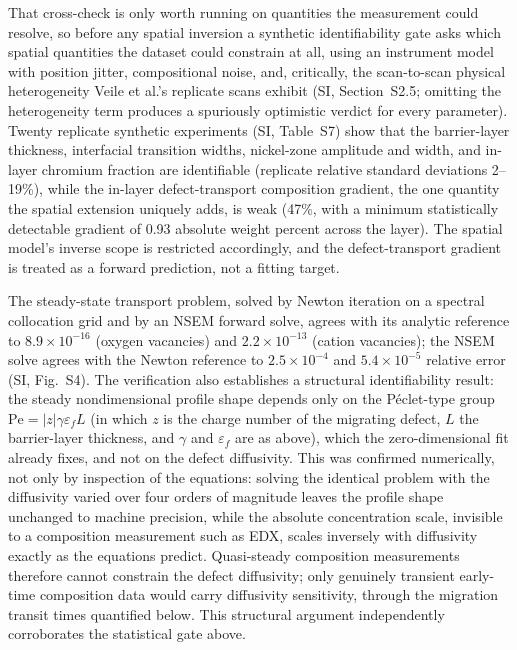 \documentclass[a4paper,fleqn]{cas-sc}
\begin{document}
That cross-check is only worth running on quantities the measurement
could resolve, so before any spatial inversion a synthetic
identifiability gate asks which spatial quantities the dataset could
constrain at all, using an
instrument model with position jitter, compositional noise, and,
critically, the scan-to-scan physical heterogeneity Veile et al.'s
replicate scans exhibit (SI, Section~S2.5; omitting the heterogeneity
term produces a spuriously optimistic verdict for every parameter).
Twenty replicate synthetic experiments (SI, Table~S7) show that
the barrier-layer thickness, interfacial transition widths, nickel-zone
amplitude and width, and in-layer chromium fraction are identifiable
(replicate relative standard deviations 2--19\%), while the in-layer
defect-transport composition gradient, the one quantity the spatial
extension uniquely adds, is weak (47\%, with a minimum statistically
detectable gradient of 0.93 absolute weight percent across the layer).
The spatial model's inverse scope is restricted accordingly, and the
defect-transport gradient is treated as a forward prediction, not a
fitting target.

The steady-state transport problem, solved by Newton iteration on a
spectral collocation grid and by an NSEM forward solve, agrees with its
analytic reference to $8.9\times10^{-16}$ (oxygen vacancies) and
$2.2\times10^{-13}$ (cation vacancies); the NSEM solve agrees with the
Newton reference to $2.5\times10^{-4}$ and $5.4\times10^{-5}$ relative
error (SI, Fig.~S4). The verification also establishes a
structural identifiability result: the steady nondimensional profile
shape depends only on the P\'eclet-type group
$\mathrm{Pe} = |z|\gamma \varepsilon_f L$ (in which $z$ is the charge
number of the migrating defect, $L$ the barrier-layer thickness, and
$\gamma$ and $\varepsilon_f$ are as above), which the zero-dimensional
fit already fixes, and not on the defect diffusivity. This was confirmed numerically,
not only by inspection of the equations: solving the identical problem
with the diffusivity varied over four orders of magnitude leaves the
profile shape unchanged to machine precision, while the absolute
concentration scale, invisible to a composition measurement such as
EDX, scales inversely with diffusivity exactly as the equations
predict. Quasi-steady composition measurements therefore cannot
constrain the defect diffusivity; only genuinely transient early-time
composition data would carry diffusivity sensitivity, through the
migration transit times quantified below. This structural argument
independently corroborates the statistical gate above.
\end{document}
